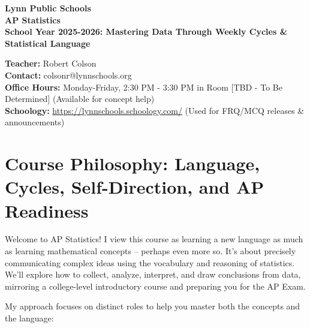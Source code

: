 \documentclass[11pt]{article}
\begin{document}
\begin{center}
\textbf{\Huge{\textcolor{lynnmaroon}{Lynn Public Schools}}}\\
\vspace{0.5em}
\textbf{\LARGE{\textcolor{lynnmaroon}{AP Statistics}}}\\
\vspace{0.5em}
\textbf{\large{\textcolor{lynngrey}{School Year 2025-2026: Mastering Data Through Weekly Cycles \& Statistical Language}}}
\end{center}

\vspace{1em}

\noindent\textbf{Teacher:} Robert Colson\\
\textbf{Contact:} colsonr@lynnschools.org\\
\textbf{Office Hours:} Monday-Friday, 2:30 PM - 3:30 PM in Room [TBD - To Be Determined] (Available for concept help)\\
\textbf{Schoology:} \href{https://lynnschools.schoology.com/}{https://lynnschools.schoology.com/} (Used for FRQ/MCQ releases \& announcements)

\section{Course Philosophy: Language, Cycles, Self-Direction, and AP Readiness}

Welcome to AP Statistics! I view this course as learning a new language as much as learning mathematical concepts – perhaps even more so. It's about precisely communicating complex ideas using the vocabulary and reasoning of statistics. We'll explore how to collect, analyze, interpret, and draw conclusions from data, mirroring a college-level introductory course and preparing you for the AP Exam.

My approach focuses on distinct roles to help you master both the concepts and the language:
\end{document}
